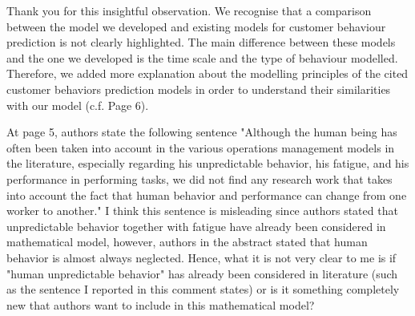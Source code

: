 \documentclass[preprint,11pt,3p]{elsarticle}
\begin{document}
\begin{tcolorbox}[colback=r_color1,colframe=r_color2,title=Response Q2  :]
	Thank you for this insightful observation. We recognise that a comparison between the model we developed and existing models for customer behaviour prediction is not clearly highlighted. The main difference between these models and the one we developed is the time scale and the type of behaviour modelled. Therefore, we added more explanation about the modelling principles of the cited customer behaviors prediction models in order to understand their similarities with our model (c.f. Page 6). 
	    
			
\end{tcolorbox}
\begin{tcolorbox}[colback=q_color1,colframe=q_color2,title=Q3  :]	
	At page 5, authors state the following sentence "Although the human being has often been taken into account in the various operations management models in the literature, especially regarding his unpredictable behavior, his fatigue, and his performance in performing tasks, we did not find any research work that takes into account the fact that human behavior and performance can change from one worker to another." I think this sentence is misleading since authors stated that unpredictable behavior together with fatigue have already been considered in mathematical model, however, authors in the abstract stated that human behavior is almost always neglected. Hence, what it is not very clear to me is if "human unpredictable behavior" has already been considered in literature (such as the sentence I reported in this comment states) or is it something completely new that authors want to include in this mathematical model?
\end{tcolorbox}
\end{document}
